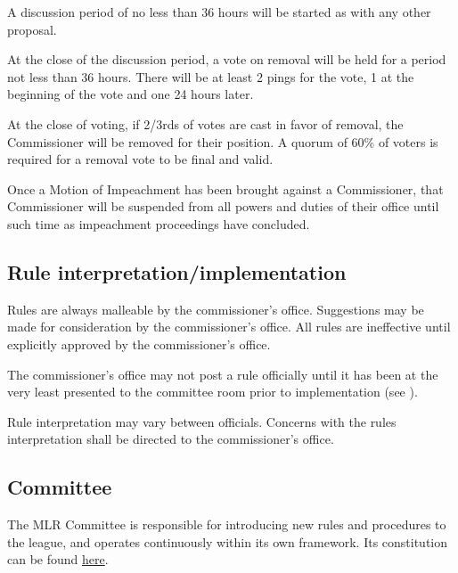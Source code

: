 \begin{deepEnumerate}
\begin{deepEnumerate}
\begin{deepEnumerate}
			A discussion period of no less than 36 hours will be started 
			as with any other proposal.
			\item At the close of the discussion period, 
			a vote on removal will be held for a period not less than 36 hours. 
			There will be at least 2 pings for the vote, 
			1 at the beginning of the vote and one 24 hours later.
			\item At the close of voting,
			if 2/3rds of votes are cast in favor of removal, 
			the Commissioner will be removed for their position. 
			A quorum of 60\% of voters is required 
			for a removal vote to be final and valid.
		\end{deepEnumerate}
		\item Once a Motion of Impeachment has been brought against a Commissioner, 
		that Commissioner will be suspended from all powers and duties of their office 
		until such time as impeachment proceedings have concluded.
	\end{deepEnumerate}
\end{deepEnumerate}

\subsection{Rule interpretation/implementation}
\begin{deepEnumerate}
	\item Rules are always malleable by the commissioner's office.
	Suggestions may be made for consideration by the commissioner's office.
	All rules are ineffective until explicitly approved by the commissioner's office.
	\item The commissioner’s office may not post a rule officially 
	until it has been at the very least presented to the committee room 
	prior to implementation (see ).
	\item Rule interpretation may vary between officials.
	Concerns with the rules interpretation shall be directed to the commissioner’s office.
\end{deepEnumerate}

\subsection{Committee}
\label{sec:Committee}
\begin{deepEnumerate}
	\item The MLR Committee is responsible for introducing new rules and procedures to the league,
	and operates continuously within its own framework.
	Its constitution can be found \href{https://docs.google.com/document/d/1_bd2r2KycOuCXXBswZ_7yTmSPYdP5W_ju41N0fB13nM/edit}{here}.
\end{deepEnumerate}

